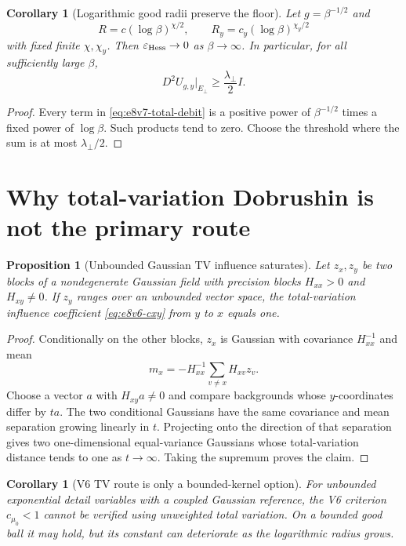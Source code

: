 \documentclass[11pt,oneside]{book}
\newtheorem{proposition}[theorem]{Proposition}
\newtheorem{corollary}[theorem]{Corollary}
\theoremstyle{definition}
\theoremstyle{remark}
\begin{document}
\begin{corollary}[Logarithmic good radii preserve the floor]
\label{cor:e8v7-log-radius}
Let \(g=\beta^{-1/2}\) and
\[
 R=c(\log\beta)^{\chi/2},\qquad
 R_y=c_y(\log\beta)^{\chi_y/2}                      \label{eq:e8v7-log-radii}
\]
with fixed finite \(\chi,\chi_y\).  Then
\(\varepsilon_{\rm Hess}\to0\) as \(\beta\to\infty\).
In particular, for all sufficiently large \(\beta\),
\[
 D^2U_{g,y}\big|_{E_\perp}\ge\frac{\lambda_\perp}{2}I. \label{eq:e8v7-half-floor}
\]
\end{corollary}

\begin{proof}
Every term in \eqref{eq:e8v7-total-debit} is a positive power of
\(\beta^{-1/2}\) times a fixed power of \(\log\beta\).  Such products
tend to zero.  Choose the threshold where the sum is at most
\(\lambda_\perp/2\).
\end{proof}

\section{Why total-variation Dobrushin is not the primary route}
\label{sec:e8v7-TV-obstruction}

\begin{proposition}[Unbounded Gaussian TV influence saturates]
\label{prop:e8v7-Gaussian-TV}
Let \(z_x,z_y\) be two blocks of a nondegenerate Gaussian field with
precision blocks \(H_{xx}>0\) and \(H_{xy}\ne0\).  If \(z_y\) ranges
over an unbounded vector space, the total-variation influence
coefficient \eqref{eq:e8v6-cxy} from \(y\) to \(x\) equals one.
\end{proposition}

\begin{proof}
Conditionally on the other blocks, \(z_x\) is Gaussian with covariance
\(H_{xx}^{-1}\) and mean
\[
 m_x=-H_{xx}^{-1}\sum_{v\ne x}H_{xv}z_v.            \label{eq:e8v7-cond-mean}
\]
Choose a vector \(a\) with \(H_{xy}a\ne0\) and compare backgrounds
whose \(y\)-coordinates differ by \(ta\).  The two conditional
Gaussians have the same covariance and mean separation growing
linearly in \(t\).  Projecting onto the direction of that separation
gives two one-dimensional equal-variance Gaussians whose
total-variation distance tends to one as \(t\to\infty\).  Taking the
supremum proves the claim.
\end{proof}

\begin{corollary}[V6 TV route is only a bounded-kernel option]
\label{cor:e8v7-TV-verdict}
For unbounded exponential detail variables with a coupled Gaussian
reference, the V6 criterion \(c_{\mu_0}<1\) cannot be verified using
unweighted total variation.  On a bounded good ball it may hold, but
its constant can deteriorate as the logarithmic radius grows.
\end{corollary}
\end{document}
